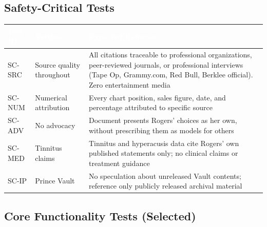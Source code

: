 \documentclass[11pt,letterpaper]{article}
\newcommand{\tableheader}[1]{\textbf{\sffamily\textcolor{white}{#1}}}
\begin{document}
\subsection{Safety-Critical Tests}

\begin{center}
\begin{tabularx}{\textwidth}{C{1.5cm}L{4cm}X}
\toprule
{}
\tableheader{Test ID} & \tableheader{Verifies} & \tableheader{Expected Behavior} \\
\midrule
SC-SRC & Source quality throughout & All citations traceable to professional organizations, peer-reviewed journals, or professional interviews (Tape Op, Grammy.com, Red Bull, Berklee official). Zero entertainment media \\
SC-NUM & Numerical attribution & Every chart position, sales figure, date, and percentage attributed to specific source \\
SC-ADV & No advocacy & Document presents Rogers' choices as her own, without prescribing them as models for others \\
SC-MED & Tinnitus claims & Tinnitus and hyperacusis data cite Rogers' own published statements only; no clinical claims or treatment guidance \\
SC-IP & Prince Vault & No speculation about unreleased Vault contents; reference only publicly released archival material \\
\bottomrule
\end{tabularx}
\end{center}

\subsection{Core Functionality Tests (Selected)}
\end{document}
